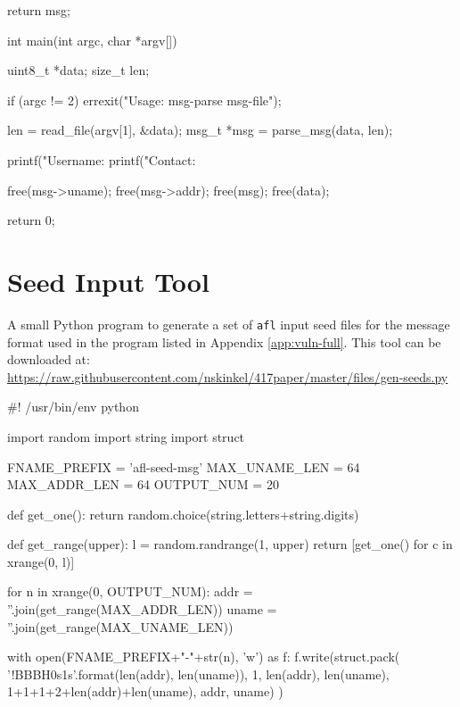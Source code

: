 \begin{appendices}
\begin{TCBlisting}[language={[ANSI]C},basicstyle=\scriptsize,caption={\mylstcaption}]
{    return msg;
}

int
main(int argc, char *argv[]) {
    uint8_t *data;
    size_t len;
    
    if (argc != 2) {
        errexit("Usage: msg-parse msg-file\n");
    }

    len = read_file(argv[1], &data);
    msg_t *msg = parse_msg(data, len);    

    printf("Username: %
    printf("Contact: %

    free(msg->uname);
    free(msg->addr);
    free(msg);
    free(data);

    return 0;
}
\end{TCBlisting}

\chapter{Seed Input Tool}
\label{app:vuln-seed}

A small Python program to generate a set of \texttt{afl} input seed files
for the message format used in the program listed in Appendix \ref{app:vuln-full}.
This tool can be downloaded at: \url{https://raw.githubusercontent.com/nskinkel/417paper/master/files/gen-seeds.py}

\renewcommand\mylstcaption{Caption goes here.}
\begin{TCBlisting}[language=Python,basicstyle=\scriptsize,caption={\mylstcaption}]
#! /usr/bin/env python

import random
import string
import struct


FNAME_PREFIX    = 'afl-seed-msg'
MAX_UNAME_LEN   = 64
MAX_ADDR_LEN    = 64
OUTPUT_NUM      = 20


def get_one():
    return random.choice(string.letters+string.digits)


def get_range(upper):
    l = random.randrange(1, upper)
    return [get_one() for c in xrange(0, l)]    
    

for n in xrange(0, OUTPUT_NUM):
    addr = ''.join(get_range(MAX_ADDR_LEN))
    uname = ''.join(get_range(MAX_UNAME_LEN))

    with open(FNAME_PREFIX+"-"+str(n), 'w') as f:
        f.write(struct.pack(
            '!BBBH{0}s{1}s'.format(len(addr), len(uname)),
            1, len(addr), len(uname),
            1+1+1+2+len(addr)+len(uname), addr, uname)
        )
\end{TCBlisting}

\end{appendices}
